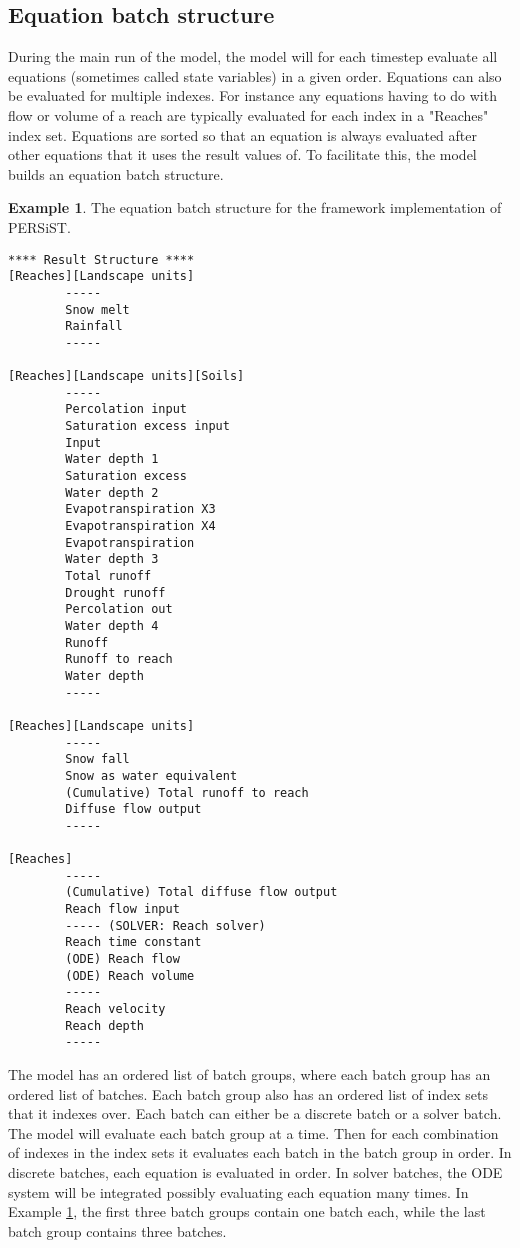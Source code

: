 \documentclass[11pt]{article}
\theoremstyle{definition}
\newtheorem{myexample}{Example}
\newenvironment{example}%
  {\begin{lrbox}{\examplebox}%
   \begin{minipage}{\dimexpr\linewidth-2\fboxsep}
   \begin{myexample}}%
  {\end{myexample}%
   \end{minipage}%
   \end{lrbox}%
   \begin{trivlist}
     \item[]\colorbox{silver}{\usebox\examplebox}
   \end{trivlist}}
\begin{document}
\subsection{Equation  batch structure}
During the main run of the model, the model will for each timestep evaluate all equations (sometimes called state variables) in a given order. Equations can also be evaluated for multiple indexes. For instance any equations having to do with flow or volume of a reach are typically evaluated for each index in a "Reaches" index set. Equations are sorted so that an equation is always evaluated after other equations that it uses the result values of. To facilitate this, the model builds an equation batch structure.

\begin{example}\label{ex:persiststructure}
The equation batch structure for the framework implementation of PERSiST.
\begin{lstlisting}[style=textstyle]
**** Result Structure ****
[Reaches][Landscape units]
        -----
        Snow melt
        Rainfall
        -----

[Reaches][Landscape units][Soils]
        -----
        Percolation input
        Saturation excess input
        Input
        Water depth 1
        Saturation excess
        Water depth 2
        Evapotranspiration X3
        Evapotranspiration X4
        Evapotranspiration
        Water depth 3
        Total runoff
        Drought runoff
        Percolation out
        Water depth 4
        Runoff
        Runoff to reach
        Water depth
        -----

[Reaches][Landscape units]
        -----
        Snow fall
        Snow as water equivalent
        (Cumulative) Total runoff to reach
        Diffuse flow output
        -----

[Reaches]
        -----
        (Cumulative) Total diffuse flow output
        Reach flow input
        ----- (SOLVER: Reach solver)
        Reach time constant
        (ODE) Reach flow
        (ODE) Reach volume
        -----
        Reach velocity
        Reach depth
        -----
\end{lstlisting}
\end{example}

The model has an ordered list of batch groups, where each batch group has an ordered list of batches. Each batch group also has an ordered list of index sets that it indexes over. Each batch can either be a discrete batch or a solver batch. The model will evaluate each batch group at a time. Then for each combination of indexes in the index sets it evaluates each batch in the batch group in order. In discrete batches, each equation is evaluated in order. In solver batches, the ODE system will be integrated possibly evaluating each equation many times. In Example \ref{ex:persiststructure}, the first three batch groups contain one batch each, while the last batch group contains three batches. 
\end{document}
